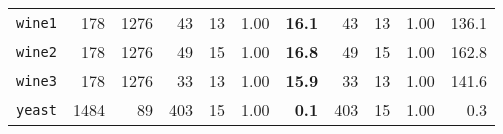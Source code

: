 \begin{tabular}{lccrrrrrrrr}
\texttt{wine1} & \multicolumn{1}{r}{178} & \multicolumn{1}{r}{1276}  & 43 & 13 & 1.00 & \textbf{16.1} & 43 & 13 & 1.00 & 136.1\\
\texttt{wine2} & \multicolumn{1}{r}{178} & \multicolumn{1}{r}{1276}  & 49 & 15 & 1.00 & \textbf{16.8} & 49 & 15 & 1.00 & 162.8\\
\texttt{wine3} & \multicolumn{1}{r}{178} & \multicolumn{1}{r}{1276}  & 33 & 13 & 1.00 & \textbf{15.9} & 33 & 13 & 1.00 & 141.6\\
\texttt{yeast} & \multicolumn{1}{r}{1484} & \multicolumn{1}{r}{89}  & 403 & 15 & 1.00 & \textbf{0.1} & 403 & 15 & 1.00 & 0.3\\
\bottomrule
\end{tabular}

